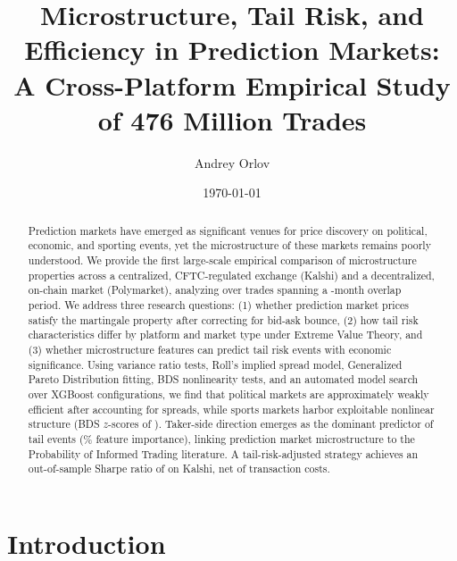 \documentclass[11pt]{article}
\title{Microstructure, Tail Risk, and Efficiency in Prediction Markets:\\
A Cross-Platform Empirical Study of 476 Million Trades}
\author{Andrey Orlov}
\date{\today}
\begin{document}
\maketitle

\begin{abstract}
Prediction markets have emerged as significant venues for price discovery on political, economic, and sporting events, yet the microstructure of these markets remains poorly understood. We provide the first large-scale empirical comparison of microstructure properties across a centralized, CFTC-regulated exchange (Kalshi) and a decentralized, on-chain market (Polymarket), analyzing over \NStandardizedTrades{} trades spanning a \NOverlapMonths-month overlap period. We address three research questions: (1) whether prediction market prices satisfy the martingale property after correcting for bid-ask bounce, (2) how tail risk characteristics differ by platform and market type under Extreme Value Theory, and (3) whether microstructure features can predict tail risk events with economic significance. Using variance ratio tests, Roll's implied spread model, Generalized Pareto Distribution fitting, BDS nonlinearity tests, and an automated model search over \NAutoresearchIters{} XGBoost configurations, we find that political markets are approximately weakly efficient after accounting for spreads, while sports markets harbor exploitable nonlinear structure (BDS $z$-scores of \BDSSportsZRange). Taker-side direction emerges as the dominant predictor of tail events (\TakerSideImportance\% feature importance), linking prediction market microstructure to the Probability of Informed Trading literature. A tail-risk-adjusted strategy achieves an out-of-sample Sharpe ratio of \BestSharpe{} on Kalshi, net of transaction costs.
\end{abstract}

\section{Introduction}
\label{sec:intro}

\end{document}
